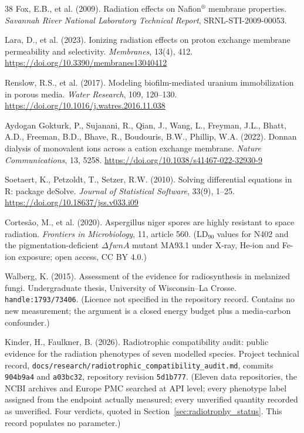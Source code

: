 \documentclass[11pt]{article}
\begin{document}
\begin{thebibliography}{38}
Fox, E.B., et al. (2009).
Radiation effects on Nafion$^{\circledR}$ membrane properties.
\textit{Savannah River National Laboratory Technical Report}, SRNL-STI-2009-00053.

Lara, D., et al. (2023).
Ionizing radiation effects on proton exchange membrane permeability and selectivity.
\textit{Membranes}, 13(4), 412.
\url{https://doi.org/10.3390/membranes13040412}

Renslow, R.S., et al. (2017).
Modeling biofilm-mediated uranium immobilization in porous media.
\textit{Water Research}, 109, 120--130.
\url{https://doi.org/10.1016/j.watres.2016.11.038}

Aydogan Gokturk, P., Sujanani, R., Qian, J., Wang, L., Freyman, J.L., Bhatt, A.D.,
Freeman, B.D., Bhave, R., Boudouris, B.W., Phillip, W.A. (2022).
Donnan dialysis of monovalent ions across a cation exchange membrane.
\textit{Nature Communications}, 13, 5258.
\url{https://doi.org/10.1038/s41467-022-32930-9}

Soetaert, K., Petzoldt, T., Setzer, R.W. (2010).
Solving differential equations in R: package deSolve.
\textit{Journal of Statistical Software}, 33(9), 1--25.
\url{https://doi.org/10.18637/jss.v033.i09}

Cortes\~{a}o, M., et al. (2020).
Aspergillus niger spores are highly resistant to space radiation.
\textit{Frontiers in Microbiology}, 11, article 560.
(LD$_{90}$ values for N402 and the pigmentation-deficient $\Delta fwnA$ mutant MA93.1 under
X-ray, He-ion and Fe-ion exposure; open access, CC BY 4.0.)

Walberg, K. (2015).
Assessment of the evidence for radiosynthesis in melanized fungi.
Undergraduate thesis, University of Wisconsin--La Crosse. \texttt{handle:1793/73406}.
(Licence not specified in the repository record. Contains no new measurement; the argument is a
closed energy budget plus a media-carbon confounder.)

Kinder, H., Faulkner, B. (2026).
Radiotrophic compatibility audit: public evidence for the radiation phenotypes of seven modelled
species. Project technical record, \texttt{docs/research/radiotrophic\_compatibility\_audit.md},
commits \texttt{904b9a4} and \texttt{a03bc32}, repository revision \texttt{5d1b777}.
(Eleven data repositories, the NCBI archives and Europe PMC searched at API level; every phenotype
label assigned from the endpoint actually measured; every unverified quantity recorded as
unverified. Four verdicts, quoted in Section~\ref{sec:radiotrophy_status}. This record populates no
parameter.)

\end{thebibliography}
\end{document}
